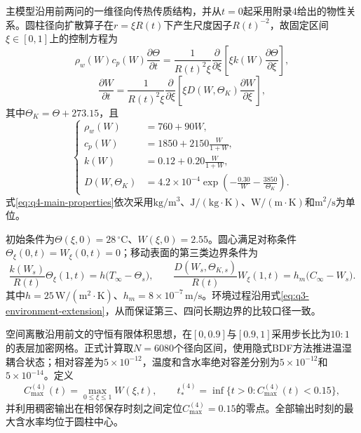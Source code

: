 \documentclass[withoutpreface,bwprint]{cumcmthesis}
\begin{document}
主模型沿用前两问的一维径向传热传质结构，并从$t=0$起采用附录4给出的物性关系。圆柱径向扩散算子在$r=\xi R(t)$下产生尺度因子$R(t)^{-2}$，故固定区间$\xi\in[0,1]$上的控制方程为
\begin{equation}
\boxed{
\rho_w(W)c_p(W)\frac{\partial\Theta}{\partial t}
=\frac{1}{R(t)^2\xi}
\frac{\partial}{\partial\xi}
\left[\xi k(W)\frac{\partial\Theta}{\partial\xi}\right],
}
\label{eq:q4-main-heat}
\end{equation}
\begin{equation}
\boxed{
\frac{\partial W}{\partial t}
=\frac{1}{R(t)^2\xi}
\frac{\partial}{\partial\xi}
\left[\xi D(W,\Theta_K)\frac{\partial W}{\partial\xi}\right],
}
\label{eq:q4-main-moisture}
\end{equation}
其中$\Theta_K=\Theta+273.15$，且
\begin{equation}
\left\{
\begin{aligned}
\rho_w(W)&=760+90W,\\
c_p(W)&=1850+2150\frac{W}{1+W},\\
k(W)&=0.12+0.20\frac{W}{1+W},\\
D(W,\Theta_K)&=4.2\times10^{-4}
\exp\!\left(-\frac{0.30}{W}-\frac{3850}{\Theta_K}\right).
\end{aligned}
\right.
\label{eq:q4-main-properties}
\end{equation}
式\eqref{eq:q4-main-properties}依次采用$\mathrm{kg/m^3}$、$\mathrm{J/(kg\cdot K)}$、$\mathrm{W/(m\cdot K)}$和$\mathrm{m^2/s}$为单位。

初始条件为$\Theta(\xi,0)=28\,{}^\circ\mathrm C$、$W(\xi,0)=2.55$。圆心满足对称条件$\Theta_\xi(0,t)=W_\xi(0,t)=0$；移动表面的第三类边界条件为
\begin{equation}
\frac{k(W_s)}{R(t)}\Theta_\xi(1,t)
=h\bigl(T_\infty-\Theta_s\bigr),
\qquad
\frac{D(W_s,\Theta_{K,s})}{R(t)}W_\xi(1,t)
=h_m\bigl(C_\infty-W_s\bigr).
\label{eq:q4-main-boundary}
\end{equation}
其中$h=25\,\mathrm{W/(m^2\cdot K)}$、$h_m=8\times10^{-7}\,\mathrm{m/s}$。环境过程沿用式\eqref{eq:q3-environment-extension}，从而保证第三、四问长期边界的比较口径一致。

空间离散沿用前文的守恒有限体积思想，在$[0,0.9]$与$[0.9,1]$采用步长比为$10:1$的表层加密网格。正式计算取$N=6080$个径向区间，使用隐式BDF方法\cite{hairer1996}推进温湿耦合状态；相对容差为$5\times10^{-12}$，温度和含水率绝对容差分别为$5\times10^{-12}$和$5\times10^{-14}$。定义
\begin{equation}
C_{\max}^{(4)}(t)=\max_{0\le\xi\le1}W(\xi,t),
\qquad
t_*^{(4)}=\inf\{t>0:C_{\max}^{(4)}(t)<0.15\},
\label{eq:q4-main-event}
\end{equation}
并利用稠密输出在相邻保存时刻之间定位$C_{\max}^{(4)}=0.15$的零点。全部输出时刻的最大含水率均位于圆柱中心。
\end{document}
